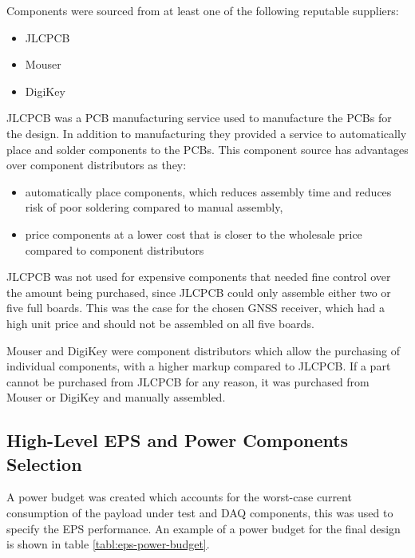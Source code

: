 \documentclass{report}
\begin{document}
Components were sourced from at least one of the following reputable suppliers:

\begin{itemize}
  \item JLCPCB
  \item Mouser
  \item DigiKey
\end{itemize}

JLCPCB was a PCB manufacturing service used to manufacture the PCBs for the design. In addition to manufacturing they provided a service to automatically place and solder components to the PCBs. This component source has advantages over component distributors as they:
\begin{itemize}
  \item automatically place components, which reduces assembly time and reduces risk of poor soldering compared to manual assembly,
  \item price components at a lower cost that is closer to the wholesale price compared to component distributors
\end{itemize}

JLCPCB was not used for expensive components that needed fine control over the amount being purchased, since JLCPCB could only assemble either two or five full boards. This was the case for the chosen GNSS receiver, which had a high unit price and should not be assembled on all five boards.

Mouser and DigiKey were component distributors which allow the purchasing of individual components, with a higher markup compared to JLCPCB. If a part cannot be purchased from JLCPCB for any reason, it was purchased from Mouser or DigiKey and manually assembled.

\subsection{High-Level EPS and Power Components Selection}

A power budget was created which accounts for the worst-case current consumption of the payload under test and DAQ components, this was used to specify the EPS performance. An example of a power budget for the final design is shown in table \ref{tabl:eps-power-budget}.
\end{document}
